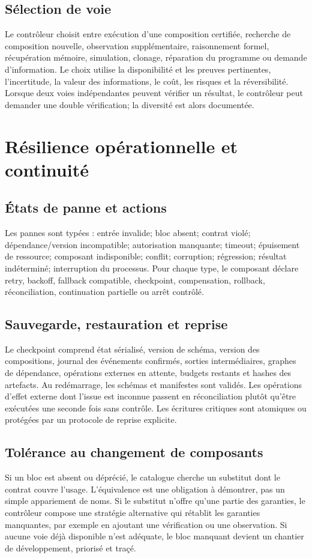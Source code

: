 \documentclass[11pt,a4paper]{article}
\begin{document}
\subsection{Sélection de voie}
Le contrôleur choisit entre exécution d'une composition certifiée, recherche de composition nouvelle, observation supplémentaire, raisonnement formel, récupération mémoire, simulation, clonage, réparation du programme ou demande d'information. Le choix utilise la disponibilité et les preuves pertinentes, l'incertitude, la valeur des informations, le coût, les risques et la réversibilité. Lorsque deux voies indépendantes peuvent vérifier un résultat, le contrôleur peut demander une double vérification; la diversité est alors documentée.

\section{Résilience opérationnelle et continuité}
\subsection{États de panne et actions}
Les pannes sont typées : entrée invalide; bloc absent; contrat violé; dépendance/version incompatible; autorisation manquante; timeout; épuisement de ressource; composant indisponible; conflit; corruption; régression; résultat indéterminé; interruption du processus. Pour chaque type, le composant déclare retry, backoff, fallback compatible, checkpoint, compensation, rollback, réconciliation, continuation partielle ou arrêt contrôlé.

\subsection{Sauvegarde, restauration et reprise}
Le checkpoint comprend état sérialisé, version de schéma, version des compositions, journal des événements confirmés, sorties intermédiaires, graphes de dépendance, opérations externes en attente, budgets restants et hashes des artefacts. Au redémarrage, les schémas et manifestes sont validés. Les opérations d'effet externe dont l'issue est inconnue passent en réconciliation plutôt qu'être exécutées une seconde fois sans contrôle. Les écritures critiques sont atomiques ou protégées par un protocole de reprise explicite.

\subsection{Tolérance au changement de composants}
Si un bloc est absent ou déprécié, le catalogue cherche un substitut dont le contrat couvre l'usage. L'équivalence est une obligation à démontrer, pas un simple appariement de noms. Si le substitut n'offre qu'une partie des garanties, le contrôleur compose une stratégie alternative qui rétablit les garanties manquantes, par exemple en ajoutant une vérification ou une observation. Si aucune voie déjà disponible n'est adéquate, le bloc manquant devient un chantier de développement, priorisé et traçé.
\end{document}
